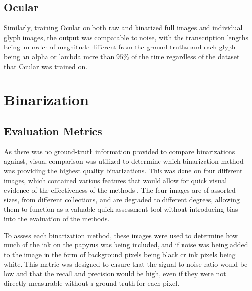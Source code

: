 \subsection{Ocular}

Similarly, training Ocular on both raw and binarized full images and individual glyph images, the output was comparable to noise, with the transcription lengths being an order of magnitude different from the ground truths and each glyph being an alpha or lambda more than $95\%$ of the time regardless of the dataset that Ocular was trained on.

\section{Binarization}

\subsection{Evaluation Metrics}

As there was no ground-truth information provided to compare binarizations against, visual comparison was utilized to determine which binarization method was providing the highest quality binarizations. This was done on four different images, which contained various features that would allow for quick visual evidence of the effectiveness of the methods . The four images are of assorted sizes, from different collections, and are degraded to different degrees, allowing them to function as a valuable quick assessment tool without introducing bias into the evaluation of the methods.

To assess each binarization method, these images were used to determine how much of the ink on the papyrus was being included, and if noise was being added to the image in the form of background pixels being black or ink pixels being white. This metric was designed to ensure that the signal-to-noise ratio would be low and that the recall and precision would be high, even if they were not directly measurable without a ground truth for each pixel.

